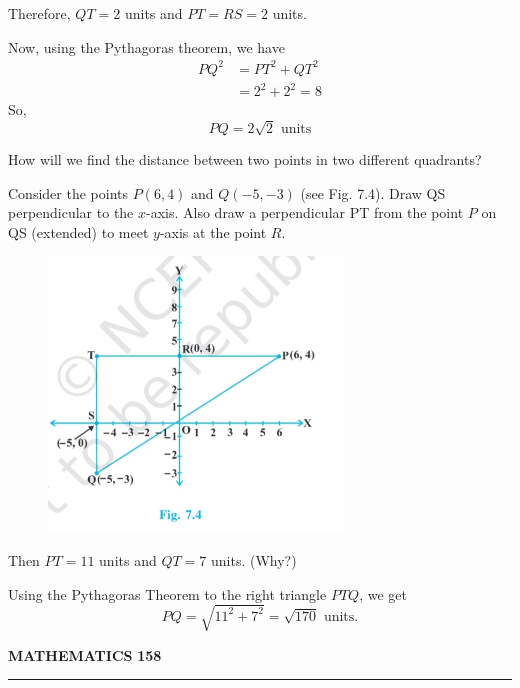 \documentclass[11pt]{article}
\begin{document}
Therefore, \(QT = 2\) units and \(PT = RS = 2\) units.

Now, using the Pythagoras theorem, we have
\[
\begin{aligned}
PQ^2 &= PT^2 + QT^2 \\
     &= 2^2 + 2^2 = 8
\end{aligned}
\]
So,
\[
PQ = 2\sqrt{2} \text{ units}
\]

How will we find the distance between two points in two different quadrants?

Consider the points \(P(6, 4)\) and \(Q(-5, -3)\) (see Fig. 7.4). Draw QS perpendicular to the \(x\)-axis. Also draw a perpendicular PT from the point \(P\) on QS (extended) to meet \(y\)-axis at the point \(R\).

\vspace{1.5em}

\begin{figure}[H]
    \centering
    \includegraphics[width=0.7\textwidth]{sup.png}
\end{figure}

Then \(PT = 11\) units and \(QT = 7\) units. (Why?)

Using the Pythagoras Theorem to the right triangle \(PTQ\), we get
\[
PQ = \sqrt{11^2 + 7^2} = \sqrt{170} \text{ units}.
\]




\vspace{3em}

{\color{ncertblue}\textbf{MATHEMATICS}} \hfill \textbf{158}

{\color{ncertblue}\noindent\rule{\textwidth}{0.5pt}}
\end{document}
